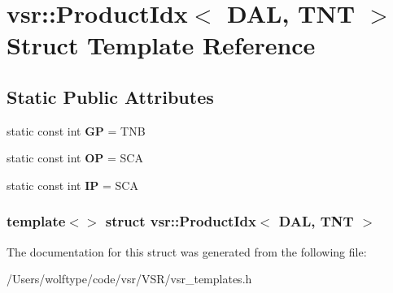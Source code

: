 \hypertarget{structvsr_1_1_product_idx_3_01_d_a_l_00_01_t_n_t_01_4}{\section{vsr\-:\-:Product\-Idx$<$ D\-A\-L, T\-N\-T $>$ Struct Template Reference}
\label{structvsr_1_1_product_idx_3_01_d_a_l_00_01_t_n_t_01_4}
}
\subsection*{Static Public Attributes}
\begin{DoxyCompactItemize}
\item 
\hypertarget{structvsr_1_1_product_idx_3_01_d_a_l_00_01_t_n_t_01_4_a378e3374dea9083c3ba90146e09a91a6}{static const int {\bfseries G\-P} = T\-N\-B}\label{structvsr_1_1_product_idx_3_01_d_a_l_00_01_t_n_t_01_4_a378e3374dea9083c3ba90146e09a91a6}

\item 
\hypertarget{structvsr_1_1_product_idx_3_01_d_a_l_00_01_t_n_t_01_4_a9d9dc9dc95ee2e4825783b31ea24c0de}{static const int {\bfseries O\-P} = S\-C\-A}\label{structvsr_1_1_product_idx_3_01_d_a_l_00_01_t_n_t_01_4_a9d9dc9dc95ee2e4825783b31ea24c0de}

\item 
\hypertarget{structvsr_1_1_product_idx_3_01_d_a_l_00_01_t_n_t_01_4_a0b8175c09b2e0cd60290fc88fcde7704}{static const int {\bfseries I\-P} = S\-C\-A}\label{structvsr_1_1_product_idx_3_01_d_a_l_00_01_t_n_t_01_4_a0b8175c09b2e0cd60290fc88fcde7704}

\end{DoxyCompactItemize}
\subsubsection*{template$<$$>$ struct vsr\-::\-Product\-Idx$<$ D\-A\-L, T\-N\-T $>$}



The documentation for this struct was generated from the following file\-:\begin{DoxyCompactItemize}
\item 
/\-Users/wolftype/code/vsr/\-V\-S\-R/vsr\-\_\-templates.\-h\end{DoxyCompactItemize}

